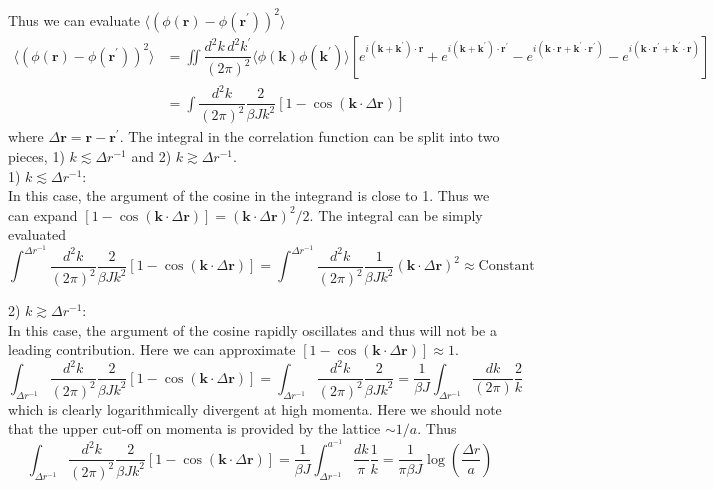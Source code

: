\documentclass[aps,prb,onecolumn,notitlepage,showpacs,floatfix,superscriptaddress]{revtex4-1}
\begin{document}
Thus we can evaluate $\langle \left( \phi({\bm r})-\phi({\bm r}^\prime)\right)^2 \rangle$
\begin{equation}
\begin{split}
\langle \left( \phi({\bm r})-\phi({\bm r}^\prime)\right)^2 \rangle &= \iint \dfrac{d^2k \, d^2k^\prime}{(2\pi)^2} \langle\phi({\bm k})  \phi({\bm k}^\prime) \rangle \left[ e^{i({\bm k}+{\bm k}^\prime)\cdot {\bm r}} + e^{i({\bm k}+{\bm k}^\prime)\cdot {\bm r}^\prime} - e^{i({\bm k}\cdot {\bm r}+{\bm k}^\prime\cdot {\bm r}^\prime)}- e^{i({\bm k}\cdot {\bm r}^\prime+{\bm k}^\prime\cdot {\bm r})}\right]\\
&= \int \dfrac{d^2k }{(2\pi)^2} \dfrac{2}{\beta J k^2}\left[1-\cos\left( {\bm k}\cdot \Delta{\bm r}\right)\right]
\end{split}
\end{equation}
where $\Delta{\bm r} = {\bm r}-{\bm r}^\prime$. The integral in the correlation function can be split into two pieces, 1) $k \lesssim \Delta r^{-1}$ and 2) $k \gtrsim \Delta r^{-1}$.\\

1) $k \lesssim \Delta r^{-1}$: \\

In this case, the argument of the cosine in the integrand is close to 1. Thus we can expand $\left[1-\cos\left( {\bm k}\cdot \Delta{\bm r}\right)\right] = ( {\bm k}\cdot \Delta{\bm r})^2/2$. The integral can be simply evaluated
\begin{equation}
\int^{\Delta r^{-1}} \dfrac{d^2k }{(2\pi)^2} \dfrac{2}{\beta J k^2}\left[1-\cos\left( {\bm k}\cdot \Delta{\bm r}\right)\right] =\int^{\Delta r^{-1}} \dfrac{d^2k }{(2\pi)^2} \dfrac{1}{\beta J k^2}( {\bm k}\cdot \Delta{\bm r})^2\approx \mathrm{Constant}
\end{equation}

2) $k \gtrsim \Delta r^{-1}$: \\

In this case, the argument of the cosine rapidly oscillates and thus will not be a leading contribution. Here we can approximate $\left[1-\cos\left( {\bm k}\cdot \Delta{\bm r}\right)\right] \approx 1$.
\begin{equation}
\int_{\Delta r^{-1}} \dfrac{d^2k }{(2\pi)^2} \dfrac{2}{\beta J k^2}\left[1-\cos\left( {\bm k}\cdot \Delta{\bm r}\right)\right] =\int_{\Delta r^{-1}} \dfrac{d^2k }{(2\pi)^2} \dfrac{2}{\beta J k^2} = \dfrac{1}{\beta J}  \int_{\Delta r^{-1}} \dfrac{dk }{(2\pi)} \dfrac{2}{k}
\end{equation}
which is clearly logarithmically divergent at high momenta. Here we should note that the upper cut-off on momenta is provided by the lattice $\sim 1/a$. Thus 
\begin{equation}
\int_{\Delta r^{-1}} \dfrac{d^2k }{(2\pi)^2} \dfrac{2}{\beta J k^2}\left[1-\cos\left( {\bm k}\cdot \Delta{\bm r}\right)\right]=  \dfrac{1}{\beta J}  \int_{\Delta r^{-1}}^{a^{-1}} \dfrac{dk }{\pi} \dfrac{1}{k} =   \dfrac{1}{\pi \beta J} \log\left( \dfrac{\Delta r}{a}\right)
\end{equation}
\end{document}
